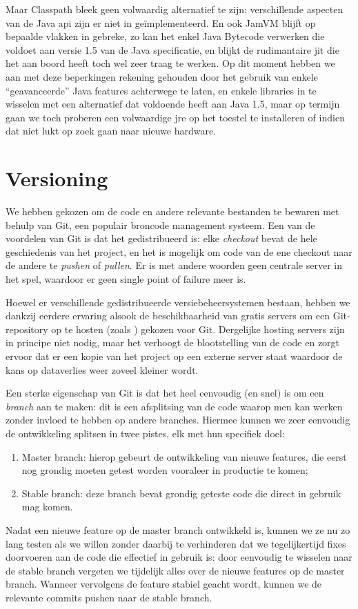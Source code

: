 Maar Classpath bleek geen volwaardig alternatief te zijn: verschillende aspecten van de Java \ac{api} zijn er niet in geïmplementeerd. En ook JamVM blijft op bepaalde vlakken in gebreke, zo kan het enkel Java Bytecode verwerken die voldoet aan versie 1.5 van de Java specificatie, en blijkt de rudimantaire \ac{jit} die het aan boord heeft toch wel zeer traag te werken. Op dit moment hebben we aan met deze beperkingen rekening gehouden door het gebruik van enkele ``geavanceerde'' Java features achterwege te laten, en enkele libraries in te wisselen met een alternatief dat voldoende heeft aan Java 1.5, maar op termijn gaan we toch proberen een volwaardige \ac{jre} op het toestel te installeren of indien dat niet lukt op zoek gaan naar nieuwe hardware.

\section{Versioning}
\label{server:deployment:versioning}

We hebben gekozen om de code en andere relevante bestanden te bewaren met behulp van Git, een populair broncode management systeem. Een van de voordelen van Git is dat het gedistribueerd is: elke \emph{checkout} bevat de hele geschiedenis van het project, en het is mogelijk om code van de ene checkout naar de andere te \emph{pushen} of \emph{pullen}. Er is met andere woorden geen centrale server in het spel, waardoor er geen single point of failure meer is.

Hoewel er verschillende gedistribueerde versiebeheersystemen bestaan, hebben we dankzij eerdere ervaring alsook de beschikbaarheid van gratis servers om een Git-repository op te hosten (zoals ) gekozen voor Git. Dergelijke hosting servers zijn in principe niet nodig, maar het verhoogt de blootstelling van de code en zorgt ervoor dat er een kopie van het project op een externe server staat waardoor de kans op dataverlies weer zoveel kleiner wordt.

Een sterke eigenschap van Git is dat het heel eenvoudig (en snel) is om een \emph{branch} aan te maken: dit is een afsplitsing van de code waarop men kan werken zonder invloed te hebben op andere branches. Hiermee kunnen we zeer eenvoudig de ontwikkeling splitsen in twee pistes, elk met hun specifiek doel:
\begin{enumerate}
  \item Master branch: hierop gebeurt de ontwikkeling van nieuwe features, die eerst nog grondig moeten getest worden vooraleer in productie te komen;
  \item Stable branch: deze branch bevat grondig geteste code die direct in gebruik mag komen.
\end{enumerate}
Nadat een nieuwe feature op de master branch ontwikkeld is, kunnen we ze nu zo lang testen als we willen zonder daarbij te verhinderen dat we tegelijkertijd fixes doorvoeren aan de code die effectief in gebruik is: door eenvoudig te wisselen naar de stable branch vergeten we tijdelijk alles over de nieuwe features op de master branch. Wanneer vervolgens de feature stabiel geacht wordt, kunnen we de relevante commits pushen naar de stable branch.

